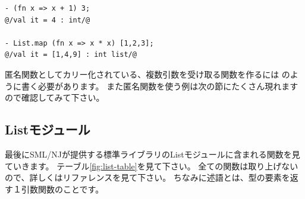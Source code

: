 \documentclass[11pt,a4paper]{jarticle}
\begin{document}
\begin{lstlisting}[caption=匿名関数,label=code:anonymous]
- (fn x => x + 1) 3;
@/val it = 4 : int/@

- List.map (fn x => x * x) [1,2,3];
@/val it = [1,4,9] : int list/@
\end{lstlisting}

匿名関数としてカリー化されている、複数引数を受け取る関数を作るには
のように書く必要があります。
また匿名関数を使う例は次の節にたくさん現れますので確認してみて下さい。

\subsection{Listモジュール}

最後にSML/NJが提供する標準ライブラリのListモジュールに含まれる関数を見ていきます。
テーブル\ref{fig:list-table}を見て下さい。
全ての関数は取り上げないので、詳しくはリファレンスを見て下さい\cite{sml-libs}。
ちなみに述語とは、型の要素を返す１引数関数のことです。
\end{document}
